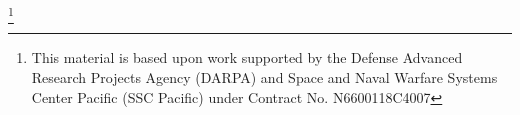 \documentclass[sigconf]{acmart}
\begin{document}
%
\renewcommand{\shortauthors}{Nguyen et al.}

\thanks{This material is based upon work supported by the Defense Advanced Research Projects Agency (DARPA) and Space and Naval Warfare Systems Center Pacific (SSC Pacific) under Contract No. N6600118C4007}
\maketitle



%

%
%


%
%



%
\renewcommand{\baselinestretch}{0.98}
%

%
% 
\end{document}
